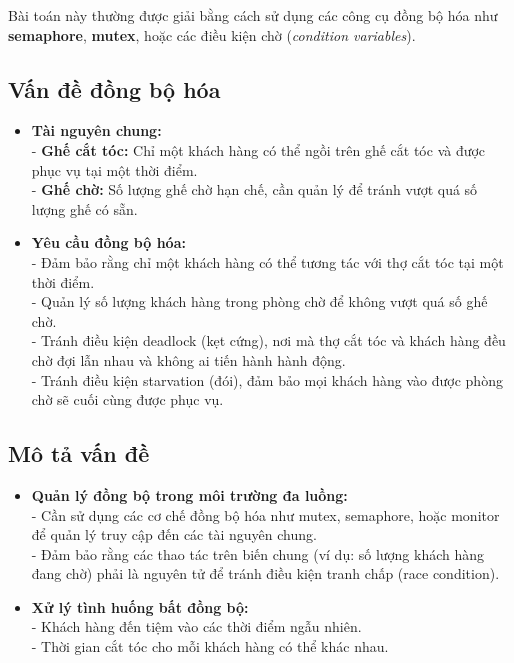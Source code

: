 Bài toán này thường được giải bằng cách sử dụng các công cụ đồng bộ hóa như \textbf{semaphore}, \textbf{mutex}, hoặc các điều kiện chờ (\textit{condition variables}).  

\subsection{Vấn đề đồng bộ hóa}
    \begin{itemize}    
        \item \textbf{Tài nguyên chung:}\\
        - \textbf{Ghế cắt tóc:} Chỉ một khách hàng có thể ngồi trên ghế cắt tóc và được phục vụ tại một thời điểm.\\
        - \textbf{Ghế chờ:} Số lượng ghế chờ hạn chế, cần quản lý để tránh vượt quá số lượng ghế có sẵn.
        
        \item \textbf{Yêu cầu đồng bộ hóa:}\\
        - Đảm bảo rằng chỉ một khách hàng có thể tương tác với thợ cắt tóc tại một thời điểm.\\
        - Quản lý số lượng khách hàng trong phòng chờ để không vượt quá số ghế chờ.\\
        - Tránh điều kiện deadlock (kẹt cứng), nơi mà thợ cắt tóc và khách hàng đều chờ đợi lẫn nhau và không ai tiến hành hành động.\\
        - Tránh điều kiện starvation (đói), đảm bảo mọi khách hàng vào được phòng chờ sẽ cuối cùng được phục vụ.
    \end{itemize}

\subsection{Mô tả vấn đề}
\begin{itemize}
    \item \textbf{Quản lý đồng bộ trong môi trường đa luồng:}\\
        - Cần sử dụng các cơ chế đồng bộ hóa như mutex, semaphore, hoặc monitor để quản lý truy cập đến các tài nguyên chung.\\
        - Đảm bảo rằng các thao tác trên biến chung (ví dụ: số lượng khách hàng đang chờ) phải là nguyên tử để tránh điều kiện tranh chấp (race condition).
    \item \textbf{Xử lý tình huống bất đồng bộ:}\\
        - Khách hàng đến tiệm vào các thời điểm ngẫu nhiên.\\
        - Thời gian cắt tóc cho mỗi khách hàng có thể khác nhau.
\end{itemize}

